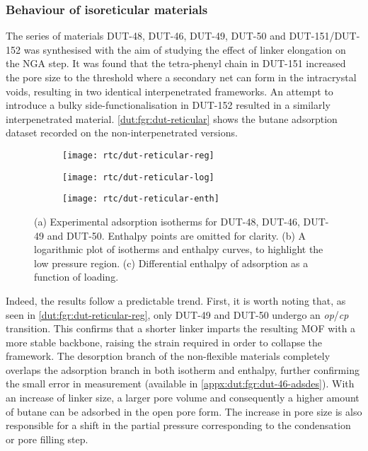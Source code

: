 \subsubsection{Behaviour of isoreticular materials}

The series of materials DUT-48, DUT-46, DUT-49, DUT-50 and DUT-151/DUT-152
was synthesised with the aim of studying the effect of linker 
elongation on the NGA step. It was found that the tetra-phenyl chain
in DUT-151 increased the pore size to the threshold 
where a secondary net can form in the intracrystal voids, resulting 
in two identical interpenetrated frameworks. An attempt to introduce 
a bulky side-functionalisation in DUT-152 resulted in a similarly
interpenetrated material. \autoref{dut:fgr:dut-reticular} shows the
butane adsorption dataset recorded on the non-interpenetrated versions.

\begin{figure}[htb]
    \centering
    \begin{subfigure}{0.33\linewidth}
        \texttt{[image: rtc/dut-reticular-reg]}%
        \caption{}\label{dut:fgr:dut-reticular-reg}
    \end{subfigure}%
    \begin{subfigure}{0.33\linewidth}
        \texttt{[image: rtc/dut-reticular-log]}%
        \caption{}\label{dut:fgr:dut-reticular-log}
    \end{subfigure}%
    \begin{subfigure}{0.33\linewidth}
        \texttt{[image: rtc/dut-reticular-enth]}%
        \caption{}\label{dut:fgr:dut-reticular-enth}
    \end{subfigure}%
    \caption{(a) Experimental adsorption isotherms for DUT-48, DUT-46, DUT-49 and 
    DUT-50. Enthalpy points are omitted for clarity. (b) A logarithmic plot of 
    isotherms and enthalpy curves, to highlight the low pressure region. 
    (c) Differential enthalpy of adsorption as a function of loading.}%
    \label{dut:fgr:dut-reticular}
\end{figure}


Indeed, the results follow a predictable trend. First, it is worth 
noting that, as seen in \autoref{dut:fgr:dut-reticular-reg}, only DUT-49 
and DUT-50 undergo an \textit{op}/\textit{cp} transition. This confirms that 
a shorter linker imparts the resulting MOF with a more stable backbone,
raising the strain required in order to collapse the framework.
The desorption branch of the non-flexible materials completely 
overlaps the adsorption branch in both isotherm and enthalpy, further
confirming the small error in measurement (available in 
\autoref{appx:dut:fgr:dut-46-adsdes}).
With an increase of linker size, a larger pore volume and consequently
a higher amount of butane can be adsorbed in the open pore form. 
The increase in pore size is also responsible for a shift in the 
partial pressure corresponding to the condensation or pore filling step.

